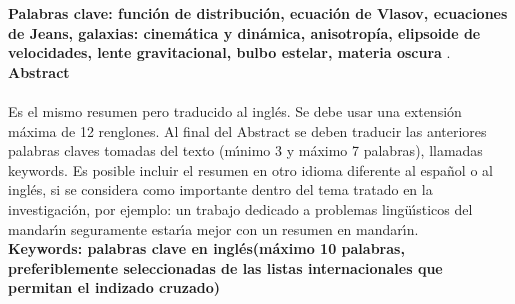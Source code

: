 \textbf{\small Palabras clave: función de distribución, ecuación de Vlasov, ecuaciones de Jeans, galaxias: cinemática y dinámica, anisotropía, elipsoide de velocidades, lente gravitacional, bulbo estelar, materia oscura  }.\\


\textbf{\LARGE Abstract}\\\\
Es el mismo resumen pero traducido al ingl\'{e}s. Se debe usar una extensi\'{o}n m\'{a}xima de 12 renglones. Al final del Abstract se deben traducir las anteriores palabras claves tomadas del texto (m\'{\i}nimo 3 y m\'{a}ximo 7 palabras), llamadas keywords. Es posible incluir el resumen en otro idioma diferente al espa\~{n}ol o al ingl\'{e}s, si se considera como importante dentro del tema tratado en la investigaci\'{o}n, por ejemplo: un trabajo dedicado a problemas ling\"{u}\'{\i}sticos del mandar\'{\i}n seguramente estar\'{\i}a mejor con un resumen en mandar\'{\i}n.\\[2.0cm]
\textbf{\small Keywords: palabras clave en ingl\'{e}s(m\'{a}ximo 10 palabras, preferiblemente seleccionadas de las listas internacionales que permitan el indizado cruzado)}\\